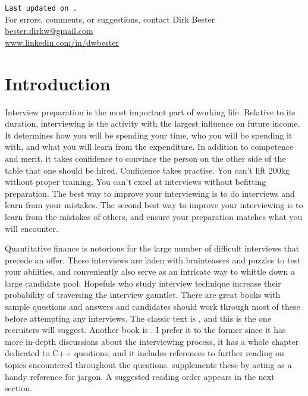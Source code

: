 \documentclass[a4paper]{article}
\begin{document}
\vfill
\begin{center}
\texttt{Last updated on .} \\
For errors, comments, or suggestions, contact Dirk Bester\\
\href{mailto:bester.dirkw@gmail.com}{bester.dirkw@gmail.com}\\
\href{https://www.linkedin.com/in/dwbester}{www.linkedin.com/in/dwbester}
\end{center}


\clearpage

\setcounter{tocdepth}{2}
\tableofcontents

\clearpage

\renewcommand{\thepage}{\arabic{page}}
\setcounter{page}{1}

{}
\section*{Introduction}

Interview preparation is the most important part of working life.
Relative to its duration, interviewing is the activity with the largest influence on future income.
It determines how you will be spending your time, who you will be spending it with, and what you will learn from the expenditure.
In addition to competence and merit, it takes confidence to convince the person on the other side of the table that one should be hired.
Confidence takes practise.
You can't lift 200kg without proper training.
You can't excel at interviews without befitting preparation.
The best way to improve your interviewing is to do interviews and learn from your mistakes.
The second best way to improve your interviewing is to learn from the mistakes of others, and ensure your preparation matches what you will encounter.


Quantitative finance is notorious for the large number of difficult interviews that precede an offer.
These interviews are laden with brainteasers and puzzles to test your abilities, and conveniently also serve as an intricate way to whittle down a large candidate pool.
Hopefuls who study interview technique increase their probability of traversing the interview gauntlet.
There are great books with sample questions and answers and candidates should work through most of these before attempting any interviews.
The classic text is \citet{HeardOnTheStreet}, and this is the one recruiters will suggest.
Another book is \citet{JoshiQA}.
I prefer it to the former since it has more in-depth discussions about the interviewing process, it has a whole chapter dedicated to C++ questions, and it includes references to further reading on topics encountered throughout the questions.
\citet{WilmottFAQ} supplements these by acting as a handy reference for jargon.
A suggested reading order appears in the next section.
\end{document}
